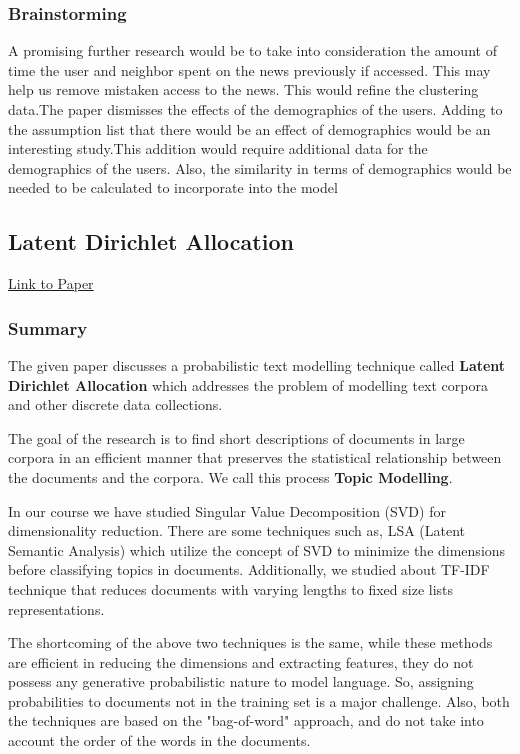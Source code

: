 \documentclass{article}
\begin{document}
\subsubsection{Brainstorming}
A promising further research would be to take into consideration the amount of time the user and neighbor spent on the news previously if accessed. This may help us remove mistaken access to the news. This would refine the clustering data.The paper dismisses the effects of the demographics of the users. Adding to the assumption list that there would be an effect of demographics would be an interesting study.This addition would require additional data for the demographics of the users. Also, the similarity in terms of demographics would be needed to be calculated to incorporate into the model

\subsection{Latent Dirichlet Allocation}
\href{http://www.jmlr.org/papers/volume3/blei03a/blei03a.pdf2}{Link to Paper}

\subsubsection{Summary}
The given paper discusses a probabilistic text modelling technique called \textbf{Latent Dirichlet Allocation} which addresses the problem of modelling text corpora and other discrete data collections. 

The goal of the research is to find short descriptions of documents in large corpora in an efficient manner that preserves the statistical relationship between the documents and the corpora. We call this process \textbf{Topic Modelling}.

In our course we have studied Singular Value Decomposition (SVD) for dimensionality reduction. There are some techniques such as, LSA (Latent Semantic Analysis) which utilize the concept of SVD to minimize the dimensions before classifying topics in documents. Additionally, we studied about TF-IDF technique that reduces documents with varying lengths to fixed size lists representations. 

The shortcoming of the above two techniques is the same, while these methods are efficient in reducing the dimensions and extracting features, they do not possess any generative probabilistic nature to model language. So, assigning probabilities to documents not in the training set is a major challenge. Also, both the techniques are based on the "bag-of-word" approach, and do not take into account the order of the words in the documents. 
\end{document}
